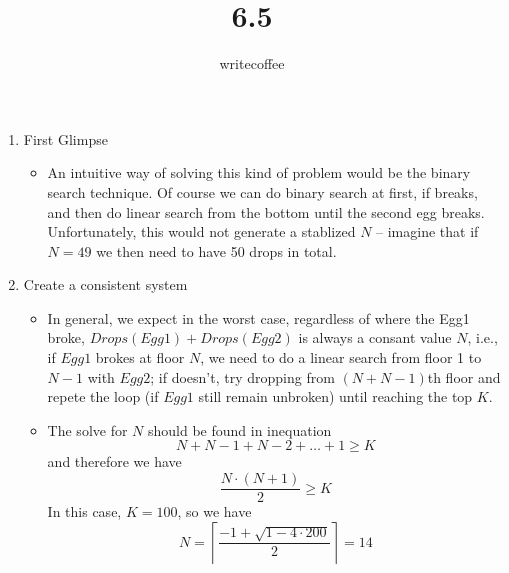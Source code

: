 \documentclass[11pt]{article}
\author{writecoffee} \title{6.5}
\begin{document}
\maketitle

{\setlength{\baselineskip}{1\baselineskip}
\setlength{\parindent}{0pt}
\setlength{\parskip}{2ex plus 0.5ex minus 0.2ex}
\begin{enumerate}[1.]
\item
	First Glimpse
	\begin{itemize}
	\item
	An intuitive way of solving this kind of problem would be the binary search technique. %
	Of course we can do binary search at first, if breaks, and then do linear search from the bottom until the second egg breaks. %
	Unfortunately, this would not generate a stablized $N$ -- imagine that if $N=49$ we then need to have 50 drops in total.
	\end{itemize}
\item
	Create a consistent system
	\begin{itemize}
	\item
	In general, we expect in the worst case, regardless of where the Egg1 broke, $Drops(Egg1) + Drops(Egg2)$ is always a consant value %
	$N$, i.e., if $Egg1$ brokes at floor $N$, we need to do a linear search from floor 1 to $N-1$ with $Egg2$; %
	if doesn't, try dropping from $(N + N -1)$th floor and repete the loop (if $Egg1$ still remain unbroken) until reaching the top %
	$K$.
	\item
	The solve for $N$ should be found in inequation
		\[N + N-1 + N-2 + \dots + 1 \ge K\]
	and therefore we have  
		\[\frac{N \cdot (N+1)}{2} \ge K\]
	In this case, $K=100$, so we have 
	\[N=\left \lceil \frac{-1+\sqrt{1-4\cdot 200}}{2} \right \rceil = 14\]
	\end{itemize}
\end{enumerate}
\par}
%
%
\end{document}
